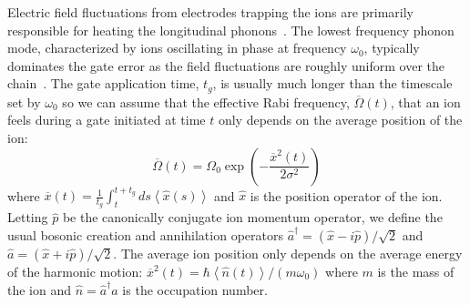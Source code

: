 \documentclass[prx,aps,twocolumn,showpacs,superscriptaddress,10pt]{revtex4-1}
\begin{document}
Electric field fluctuations from electrodes trapping the ions are primarily responsible for heating the longitudinal phonons~\cite{Brownnutt2015}.  The lowest frequency phonon mode, characterized by ions oscillating in phase at frequency $\omega_{0}$, typically dominates the gate error as the field fluctuations are roughly uniform over the chain~\cite{Cetina2020}. The gate application time, $t_{g}$, is usually much longer than the timescale set by $\omega_{0}$ so we can assume that the effective Rabi frequency, $\overline{\Omega}(t)$, that an ion feels during a gate initiated at time $t$ only depends on the average position of the ion:
\begin{equation}\label{eq:avgRabi}
	\overline{\Omega}(t) = \Omega_{0}\exp\left(-\frac{\overline{x}^{2}(t)}{2\sigma^2}\right)
\end{equation}
where $\overline{x}(t)=\frac{1}{t_{g}}\int_{t}^{t+t_{g}}ds\left\langle\hat{x}(s)\right\rangle$ and $\hat{x}$ is the position operator of the ion. Letting $\hat{p}$ be the canonically conjugate ion momentum operator, we define the usual bosonic creation and annihilation operators $\hat{a}^{\dagger}=\left(\hat{x}-i\hat{p}\right)/\sqrt{2}$ and $\hat{a}=\left(\hat{x}+i\hat{p}\right)/\sqrt{2}$. The average ion position only depends on the average energy of the harmonic motion: $\overline{x}^{2}(t)=\hbar\left\langle\hat{n}(t)\right\rangle/\left(m\omega_{0}\right)$ where $m$ is the mass of the ion and $\hat{n}=\hat{a}^{\dagger}\hat{a}$ is the occupation number. 
\end{document}
